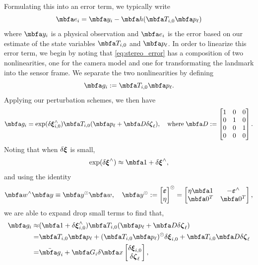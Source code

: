 \documentclass[10pt,letterpaper,fleqn,oneside]{article}
\begin{document}
\noindent Formulating this into an error term, we typically write
%
\begin{equation}
\label{eq:stereo_error}
\mbf{e}_i = \mbf{y}_i - \mbf{h}(\mbf{T}_{i,0} \mbf{p}_\ell)
\end{equation}
%
where $\mbf{y}_i$ is a physical observation and $\mbf{e}_i$ is the error based on our estimate of the state variables $\mbf{T}_{i,0}$ and $\mbf{p}_\ell$.
In order to linearize this error term, we begin by noting that \eqref{eq:stereo_error} has a composition of two nonlinearities, one for the camera model and one for transformating the landmark into the sensor frame.
We separate the two nonlinearities by defining
%
\begin{equation}
\mbf{g}_i := \mbf{T}_{i,0} \mbf{p}_\ell.
\end{equation}
%
Applying our perturbation schemes, we then have
%
\begin{equation}
\mbf{g}_i = \exp(\delta\mbs{\xi}_{i,0}^\wedge) \mbf{T}_{i,0} (\mbf{p}_\ell + \mbf{D} \delta\mbs{\zeta}_\ell), \quad
\text{where} \; \mbf{D} := \bbm 1 & 0 & 0 \\ 0 & 1 & 0 \\ 0 & 0 & 1 \\ 0 & 0 & 0 \ebm.
\end{equation}
%
Noting that when $\delta{\boldsymbol{\xi}}$ is small, 
%
\begin{equation}
\exp(\delta\mbs{\xi}^\wedge) \approx \mbf{1} + \delta\mbs{\xi}^\wedge,
\end{equation}
%
and using the identity
\begin{equation}
\mbf{w}^\wedge \mbf{y} \equiv \mbf{y}^\odot \mbf{w}, \quad
\mbf{y}^\odot := \bbm \mbs{\varepsilon} \\ \eta \ebm^\odot = \bbm \eta \mbf{1} & -\mbs{\varepsilon}^\wedge \\ \mbf{0}^T & \mbf{0}^T \ebm,
\end{equation}
%
we are able to expand drop small terms to find that,
%
\begin{align}
\mbf{g}_i \approx& (\mbf{1} + \delta\mbs{\xi}_{i,0}^\wedge) \mbf{T}_{i,0} (\mbf{p}_\ell + \mbf{D} \delta\mbs{\zeta}_\ell) \\
%
=& \mbf{T}_{i,0} \mbf{p}_\ell + (\mbf{T}_{i,0} \mbf{p}_\ell)^\odot \delta\mbs{\xi}_{i,0} + \mbf{T}_{i,0} \mbf{D} \delta\mbs{\zeta}_\ell \\
%
=& \mbfbar{g}_i + \mbf{G}_i \delta\mbf{x} \bbm \delta\mbs{\xi}_{i,0} \\ \delta\mbs{\zeta}_\ell \ebm,
\end{align}
\end{document}
